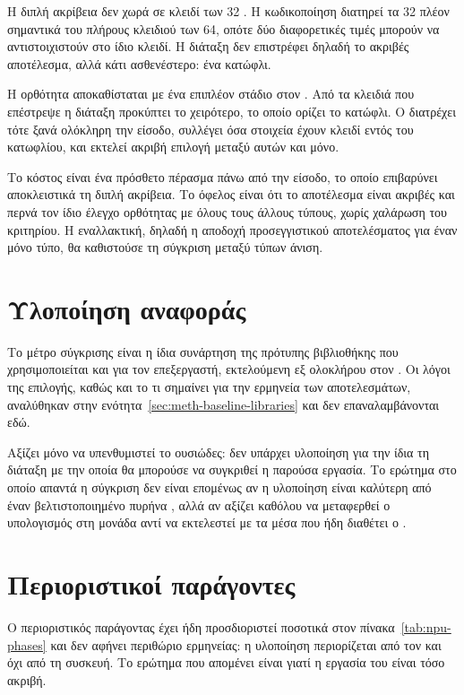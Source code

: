 Η διπλή ακρίβεια δεν χωρά σε κλειδί των 32 . Η κωδικοποίηση διατηρεί τα
32 πλέον σημαντικά  του πλήρους κλειδιού των 64, οπότε δύο διαφορετικές
τιμές μπορούν να αντιστοιχιστούν στο ίδιο κλειδί. Η διάταξη δεν επιστρέφει
δηλαδή το ακριβές αποτέλεσμα, αλλά κάτι ασθενέστερο: ένα κατώφλι.

Η ορθότητα αποκαθίσταται με ένα επιπλέον στάδιο στον . Από τα κλειδιά
που επέστρεψε η διάταξη προκύπτει το χειρότερο, το οποίο ορίζει το κατώφλι. Ο
 διατρέχει τότε ξανά ολόκληρη την είσοδο, συλλέγει όσα στοιχεία έχουν
κλειδί εντός του κατωφλίου, και εκτελεί ακριβή επιλογή μεταξύ αυτών και μόνο.

Το κόστος είναι ένα πρόσθετο πέρασμα πάνω από την είσοδο, το οποίο επιβαρύνει
αποκλειστικά τη διπλή ακρίβεια. Το όφελος είναι ότι το αποτέλεσμα είναι ακριβές
και περνά τον ίδιο έλεγχο ορθότητας με όλους τους άλλους τύπους, χωρίς χαλάρωση
του κριτηρίου. Η εναλλακτική, δηλαδή η αποδοχή προσεγγιστικού αποτελέσματος για
έναν μόνο τύπο, θα καθιστούσε τη σύγκριση μεταξύ τύπων άνιση.

\section{Υλοποίηση αναφοράς}
\label{sec:npu-reference}

Το μέτρο σύγκρισης είναι η ίδια συνάρτηση της πρότυπης βιβλιοθήκης που
χρησιμοποιείται και για τον επεξεργαστή, εκτελούμενη εξ ολοκλήρου στον
. Οι λόγοι της επιλογής, καθώς και το τι σημαίνει για την ερμηνεία των
αποτελεσμάτων, αναλύθηκαν στην ενότητα~\ref{sec:meth-baseline-libraries} και δεν
επαναλαμβάνονται εδώ.

Αξίζει μόνο να υπενθυμιστεί το ουσιώδες: δεν υπάρχει υλοποίηση  για την
ίδια τη διάταξη με την οποία θα μπορούσε να συγκριθεί η παρούσα εργασία. Το
ερώτημα στο οποίο απαντά η σύγκριση δεν είναι επομένως αν η υλοποίηση είναι
καλύτερη από έναν βελτιστοποιημένο πυρήνα , αλλά αν αξίζει καθόλου να
μεταφερθεί ο υπολογισμός στη μονάδα αντί να εκτελεστεί με τα μέσα που ήδη
διαθέτει ο .

\section{Περιοριστικοί παράγοντες}
\label{sec:npu-bottlenecks}

Ο περιοριστικός παράγοντας έχει ήδη προσδιοριστεί ποσοτικά στον
πίνακα~\ref{tab:npu-phases} και δεν αφήνει περιθώριο ερμηνείας: η υλοποίηση
περιορίζεται από τον  και όχι από τη συσκευή. Το ερώτημα που απομένει
είναι γιατί η εργασία του  είναι τόσο ακριβή.

